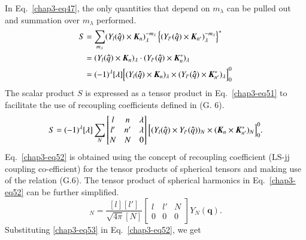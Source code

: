 In Eq.\ \eqref{chap3-eq47}, the only quantities that depend on $m_\lambda$ can be pulled out and summation over $m_\lambda$ performed.
\begin{align}
  S & = \sum_{m_\lambda} (Y_l ({\boldsymbol \hat{q}}) \times {\boldsymbol K}_n)_\lambda^{-m_\lambda}
  \left\{ (Y_{l'} ({\boldsymbol \hat{q}}) \times {\boldsymbol K}_{n'})_\lambda^{-m_\lambda}\right\}^\ast \notag \\
  & = (Y_l ({\boldsymbol \hat{q}}) \times {\boldsymbol K}_n)_\lambda \cdot (Y_{l'}({\boldsymbol \hat{q}}) \times {\boldsymbol K}_n^\ast)_\lambda \notag\\
  & = (-1)^\lambda [\lambda] \Bigl[(Y_l ({\boldsymbol \hat{q}}) \times  {\boldsymbol K}_n)_\lambda \times (Y_{l'}({\boldsymbol \hat{q}}) \times {\boldsymbol K}_{n'}^{\ast})_\lambda \Bigr]_0^0 \label{chap3-eq51}
\end{align}
The scalar product $S$ is expressed as a tensor product in Eq.\ \eqref{chap3-eq51} to facilitate the use of recoupling coefficients defined in (G. 6).
\begin{equation}
  S= (-1)^\lambda [\lambda] \sum_{N} \begin{bmatrix} l & n & \lambda \\ l' & n' & \lambda\\ N & N & 0\end{bmatrix}
    \Bigl[(Y_l ({\boldsymbol \hat{q}}) \times Y_{l'}({\boldsymbol \hat{q}}))_N \times ({\boldsymbol K}_n \times {\boldsymbol K}_{n'}^\ast)_N\Bigr]_0^0. \label{chap3-eq52}
\end{equation}
Eq.\ \eqref{chap3-eq52} is obtained using the concept of recoupling coefficient (LS-jj coupling co-efficient) for the tensor products of spherical tensors and making use of the relation (G.6). The tensor product of spherical harmonics in Eq.\ \eqref{chap3-eq52} can be further simplified.
\begin{equation}
  [Y_l({\boldsymbol \hat{q}}) \times Y_{l'}({\boldsymbol \hat{q}})]_N = \frac{[l][l']}{\sqrt{4\pi}[N]}
  \begin{bmatrix}l & l' & N\\ 0 & 0 & 0  \end{bmatrix} Y_N ({\boldsymbol q}). \label{chap3-eq53}
\end{equation}
Substituting \eqref{chap3-eq53} in Eq.\ \eqref{chap3-eq52}, we get
